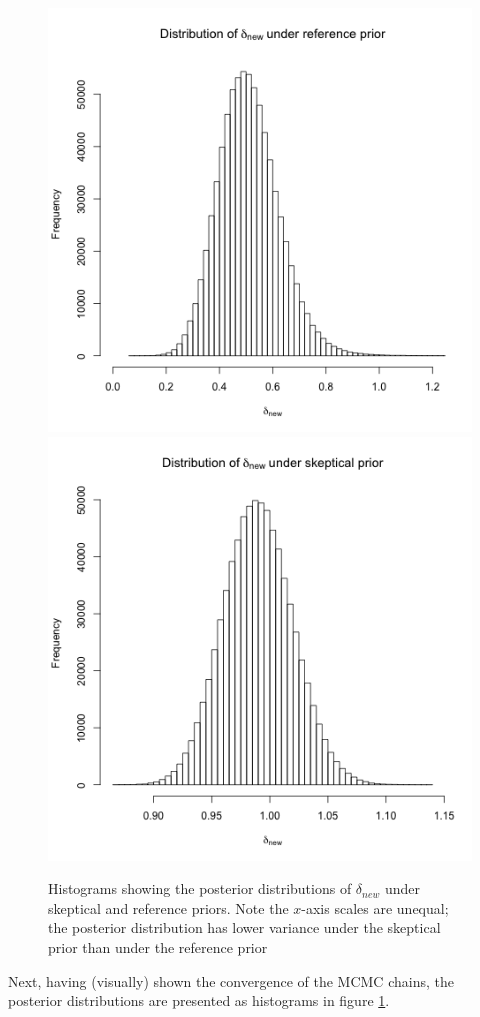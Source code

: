 \documentclass[fleqn,10pt]{SelfArx} %
\begin{document}
\begin{center}
\begin{figure}
\includegraphics[scale=0.55]{./../figures/reference_hist.png}\\
\includegraphics[scale=0.55]{./../figures/skeptical_hist.png}
\caption{Histograms showing the posterior distributions of $\delta_{new}$ under skeptical and reference priors. Note the $x$-axis scales are unequal; the posterior distribution has lower variance under the skeptical prior than under the reference prior}
\label{fig:post_hists}
\end{figure}
\end{center}
Next, having (visually) shown the convergence of the MCMC chains, the posterior distributions are presented as histograms in figure \ref{fig:post_hists}.
\end{document}
